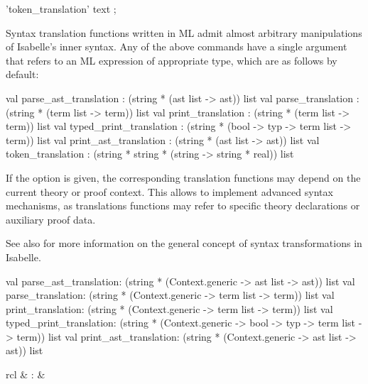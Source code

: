 \begin{isabellebody}
\begin{isamarkuptext}
\begin{rail}
  'token\_translation' text
  ;
  \end{rail}

  Syntax translation functions written in ML admit almost arbitrary
  manipulations of Isabelle's inner syntax.  Any of the above commands
  have a single  argument that refers to an ML
  expression of appropriate type, which are as follows by default:

\begin{ttbox}
val parse_ast_translation   : (string * (ast list -> ast)) list
val parse_translation       : (string * (term list -> term)) list
val print_translation       : (string * (term list -> term)) list
val typed_print_translation :
  (string * (bool -> typ -> term list -> term)) list
val print_ast_translation   : (string * (ast list -> ast)) list
val token_translation       :
  (string * string * (string -> string * real)) list
\end{ttbox}

  If the  option is given, the corresponding
  translation functions may depend on the current theory or proof
  context.  This allows to implement advanced syntax mechanisms, as
  translations functions may refer to specific theory declarations or
  auxiliary proof data.

  See also \cite[\S8]{isabelle-ref} for more information on the
  general concept of syntax transformations in Isabelle.

\begin{ttbox}
val parse_ast_translation:
  (string * (Context.generic -> ast list -> ast)) list
val parse_translation:
  (string * (Context.generic -> term list -> term)) list
val print_translation:
  (string * (Context.generic -> term list -> term)) list
val typed_print_translation:
  (string * (Context.generic -> bool -> typ -> term list -> term)) list
val print_ast_translation:
  (string * (Context.generic -> ast list -> ast)) list
\end{ttbox}%
\end{isamarkuptext}%
\isamarkuptrue%
%
\isamarkuptrue%
%
\begin{isamarkuptext}%
\begin{matharray}{rcl}
    \hypertarget{command.oracle}{\hyperlink{command.oracle}{\mbox{}}} & : &  \\
  \end{matharray}


\end{isamarkuptext}
\end{isabellebody}
